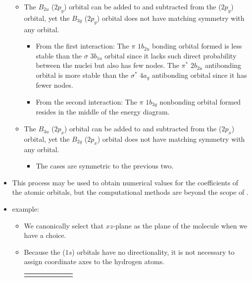 \documentclass[../notes.tex]{subfiles}
\begin{document}
\begin{itemize}
\begin{itemize}
        \item The $B_{2u}$ ($2p_y$) orbital can be added to and subtracted from the ($2p_y$) orbital, yet the $B_{3g}$ ($2p_y$) orbital does not have matching symmetry with any  orbital.
        \begin{itemize}
            \item From the first interaction: The $\pi$ $1b_{2u}$ bonding orbital formed is less stable than the $\sigma$ $3b_{1u}$ orbital since it lacks such direct probability between the nuclei but also has few nodes. The $\pi^*$ $2b_{2u}$ antibonding orbital is more stable than the $\sigma^*$ $4a_g$ antibonding orbital since it has fewer nodes.
            \item From the second interaction: The $\pi$ $1b_{3g}$ nonbonding orbital formed resides in the middle of the energy diagram.
        \end{itemize}
        \item The $B_{3u}$ ($2p_x$) orbital can be added to and subtracted from the ($2p_x$) orbital, yet the $B_{2g}$ ($2p_x$) orbital does not have matching symmetry with any  orbital.
        \begin{itemize}
            \item The cases are symmetric to the previous two.
        \end{itemize}
    \end{itemize}
    \item This process may be used to obtain numerical values for the coefficients of the atomic orbitals, but the computational methods are beyond the scope of \textcite{bib:MiesslerFischerTarr}.
    \item {} example:
    \begin{itemize}
        \item We canonically select that $xz$-plane as the plane of the molecule when we have a choice.
        \item Because the ($1s$) orbitals have no directionality, it is not necessary to assign coordinate axes to the hydrogen atoms.
        \begin{table}[h!]
            \centering
            \renewcommand{\arraystretch}{1.6}
            \setlength{\tabcolsep}{1mm}
            \small
            \begin{tabular}{lccccll}
                \rowcolor{grx}

\end{tabular}
\end{table}
\end{itemize}
\end{itemize}
\end{document}
